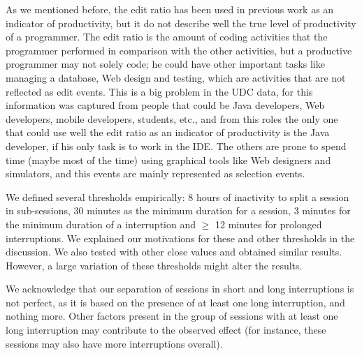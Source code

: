 \documentclass[times]{smrauth}
\newcommand\RR[1]{\textbf{Romain #1}}
\begin{document}
As we mentioned before, the edit ratio has been used in previous work as an indicator of productivity, but it do not describe well the true level of productivity of a programmer. The edit ratio is the amount of coding activities that the programmer performed in comparison with the other activities, but a productive programmer may not solely code; he could have other important tasks like managing a database, Web design and testing, which are activities that are not reflected as edit events. This is a big problem in the UDC data, for this information was captured from people that could be Java developers, Web developers, mobile developers, students, etc., and from this roles the only one that could use well the edit ratio as an indicator of productivity is the Java developer, if his only task is to work in the IDE. The others are prone to spend time (maybe most of the time) using graphical tools like Web designers and simulators, and this events are mainly represented as selection events.

We defined several thresholds empirically: 8 hours of inactivity to split a session in sub-sessions, 30 minutes as the minimum duration for a session, 3 minutes for the minimum duration of a interruption and  $\geq$ 12 minutes for prolonged interruptions. We explained our motivations for these and other thresholds in the discussion. We also tested with other close values and obtained similar results. However, a large variation of these thresholds might alter the results. 

We acknowledge that our separation of sessions in short and long interruptions is not perfect, as it is based on the presence of at least one long interruption, and nothing more. Other factors present in the group of sessions with at least one long interruption may contribute to the observed effect (for instance, these sessions may also have more interruptions overall).


\end{document}
